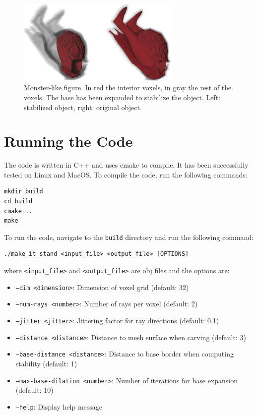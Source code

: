 \documentclass[tikz,10pt,fleqn]{article}
\begin{document}
\begin{figure}[H]
    \centering
    \includegraphics[width=0.7\textwidth]{fig/mrhumpty.png}
    \caption{Monster-like figure. In red the interior voxels, in gray the rest of the voxels. The base has been expanded to stabilize the object. Left: stabilized object, right: original object.}
    \label{fig:monster}
\end{figure}


\section{Running the Code}
The code is written in C++ and uses cmake to compile. It has been successfully tested on Linux and MacOS. To compile the code, run the following commands:
\begin{verbatim}
mkdir build
cd build
cmake ..
make
\end{verbatim}

To run the code, navigate to the \texttt{build} directory and run the following command:
\begin{verbatim}
./make_it_stand <input_file> <output_file> [OPTIONS]
\end{verbatim}
where \texttt{<input_file>} and \texttt{<output_file>} are obj files and the options are:
\begin{itemize}
    \item \texttt{--dim <dimension>}: Dimension of voxel grid (default: 32)
    \item \texttt{--num-rays <number>}: Number of rays per voxel (default: 2)
    \item \texttt{--jitter <jitter>}: Jittering factor for ray directions (default: 0.1)
    \item \texttt{--distance <distance>}: Distance to mesh surface when carving (default: 3)
    \item \texttt{--base-distance <distance>}: Distance to base border when computing stability (default: 1)
    \item \texttt{--max-base-dilation <number>}: Number of iterations for base expansion (default: 10)
    \item \texttt{--help}: Display help message
\end{itemize}   







\end{document}
